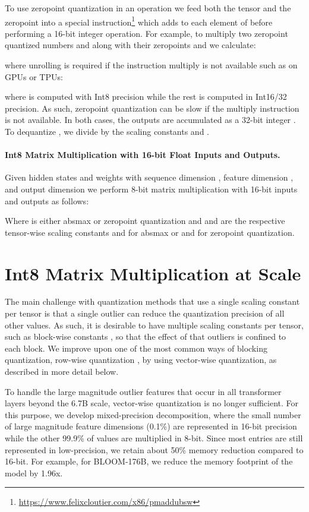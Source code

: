 \documentclass{article}
\begin{document}
To use zeropoint quantization in an operation we feed both the tensor  and the zeropoint  into a special instruction\footnote{\url{https://www.felixcloutier.com/x86/pmaddubsw}} which adds  to each element of  before performing a 16-bit integer operation. For example, to multiply two zeropoint quantized numbers  and  along with their zeropoints  and  we calculate:

where unrolling is required if the instruction multiply is not available such as on GPUs or TPUs:

where  is computed with Int8 precision while the rest is computed in Int16/32 precision. As such, zeropoint quantization can be slow if the multiply instruction is not available. In both cases, the outputs are accumulated as a 32-bit integer . To dequantize , we divide by the scaling constants  and .

\paragraph{Int8 Matrix Multiplication with 16-bit Float Inputs and Outputs.}

Given hidden states  and weights  with sequence dimension , feature dimension , and output dimension  we perform 8-bit matrix multiplication with 16-bit inputs and outputs as follows:

Where  is either absmax or zeropoint quantization and  and  are the respective tensor-wise scaling constants  and  for absmax or  and  for zeropoint quantization.


\section{Int8 Matrix Multiplication at Scale}
\label{sec:matmulatscale}

The main challenge with quantization methods that use a single scaling constant per tensor is that a single outlier can reduce the quantization precision of all other values. As such, it is desirable to have multiple scaling constants per tensor, such as block-wise constants \citep{dettmers2022optimizers}, so that the effect of that outliers is confined to each block. We improve upon one of the most common ways of blocking quantization, row-wise quantization \citep{fbgemm}, by using vector-wise quantization, as described in more detail below.

To handle the large magnitude outlier features that occur in all transformer layers beyond the 6.7B scale, vector-wise quantization is no longer sufficient. For this purpose, we develop mixed-precision decomposition, where the small number of large magnitude feature dimensions (0.1\%) are represented in 16-bit precision while the other 99.9\% of values are multiplied in 8-bit. Since most entries are still represented in low-precision, we retain about 50\% memory reduction compared to 16-bit. For example, for BLOOM-176B, we reduce the memory footprint of the model by 1.96x.
\end{document}
